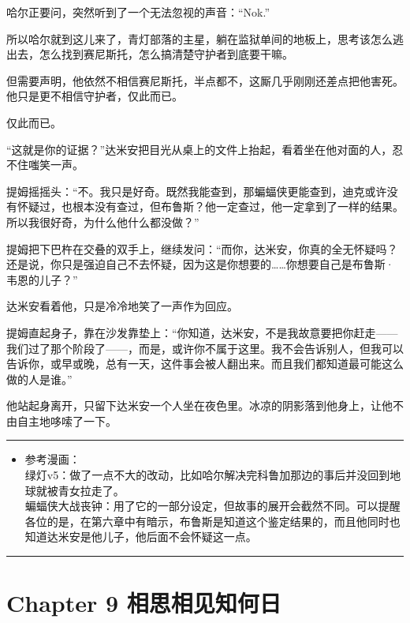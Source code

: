 \documentclass[../main]{subfiles}
\begin{document}
哈尔正要问，突然听到了一个无法忽视的声音：“Nok.”

所以哈尔就到这儿来了，青灯部落的主星，躺在监狱单间的地板上，思考该怎么逃出去，怎么找到赛尼斯托，怎么搞清楚守护者到底要干嘛。

但需要声明，他依然不相信赛尼斯托，半点都不，这厮几乎刚刚还差点把他害死。他只是更不相信守护者，仅此而已。

仅此而已。

“这就是你的证据？”达米安把目光从桌上的文件上抬起，看着坐在他对面的人，忍不住嗤笑一声。

提姆摇摇头：“不。我只是好奇。既然我能查到，那蝙蝠侠更能查到，迪克或许没有怀疑过，也根本没有查过，但布鲁斯？他一定查过，他一定拿到了一样的结果。所以我很好奇，为什么他什么都没做？”

提姆把下巴杵在交叠的双手上，继续发问：“而你，达米安，你真的全无怀疑吗？还是说，你只是强迫自己不去怀疑，因为这是你想要的……你想要自己是布鲁斯·韦恩的儿子？”

达米安看着他，只是冷冷地笑了一声作为回应。

提姆直起身子，靠在沙发靠垫上：“你知道，达米安，不是我故意要把你赶走——我们过了那个阶段了——，而是，或许你不属于这里。我不会告诉别人，但我可以告诉你，或早或晚，总有一天，这件事会被人翻出来。而且我们都知道最可能这么做的人是谁。”

他站起身离开，只留下达米安一个人坐在夜色里。冰凉的阴影落到他身上，让他不由自主地哆嗦了一下。

\begin{center}\rule{0.5\linewidth}{0.5pt}\end{center}

\begin{itemize}
    \item
          参考漫画：\\
          绿灯v5：做了一点不大的改动，比如哈尔解决完科鲁加那边的事后并没回到地球就被青女拉走了。\\
          蝙蝠侠大战丧钟：用了它的一部分设定，但故事的展开会截然不同。可以提醒各位的是，在第六章中有暗示，布鲁斯是知道这个鉴定结果的，而且他同时也知道达米安是他儿子，他后面不会怀疑这一点。
\end{itemize}

\begin{center}\rule{0.5\linewidth}{0.5pt}\end{center}

\hypertarget{chapter-9-ux76f8ux601dux76f8ux89c1ux77e5ux4f55ux65e5}{%
    \section{Chapter 9
      相思相见知何日}\label{chapter-9-ux76f8ux601dux76f8ux89c1ux77e5ux4f55ux65e5}}
\end{document}
